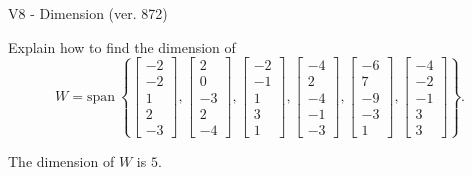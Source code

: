 \begin{exercise}
  \begin{exerciseTitle}V8 - Dimension (ver. 872)\end{exerciseTitle}
  \begin{exerciseStatement}
    Explain how to find the dimension of 
\[W=\mathrm{span}\ \left\{\left[\begin{array}{r}
-2 \\
-2 \\
1 \\
2 \\
-3
\end{array}\right] , \left[\begin{array}{r}
2 \\
0 \\
-3 \\
2 \\
-4
\end{array}\right] , \left[\begin{array}{r}
-2 \\
-1 \\
1 \\
3 \\
1
\end{array}\right] , \left[\begin{array}{r}
-4 \\
2 \\
-4 \\
-1 \\
-3
\end{array}\right] , \left[\begin{array}{r}
-6 \\
7 \\
-9 \\
-3 \\
1
\end{array}\right] , \left[\begin{array}{r}
-4 \\
-2 \\
-1 \\
3 \\
3
\end{array}\right]\right\}.\]



  \end{exerciseStatement}
  \begin{exerciseAnswer}
   The dimension of \(W\) is  \(5\).
  


  \end{exerciseAnswer}
\end{exercise}